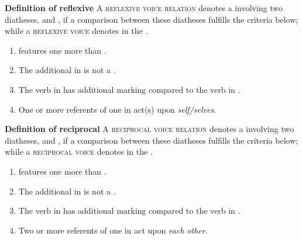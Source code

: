 \smallskip

\noindent
\begin{center}
	\begin{minipage}{0.80\textwidth}
		\textbf{Definition of reflexive} \newline
		A \textsc{reflexive voice relation} denotes a  involving two diatheses,  and , if a comparison between these diatheses fulfills the criteria below; while a \textsc{reflexive voice} denotes  in the .
		\begin{enumerate}[label=\roman*)]
			\item {} features one  more than .
			\item The additional  in  is not a .
			\item The verb in  has additional marking compared to the verb in .
			\item One or more referents of one  in  act(s) upon \textit{self/selves}.
		\end{enumerate}
	\end{minipage}
\end{center}

\noindent
\begin{center}
	\begin{minipage}{0.80\textwidth}
		\textbf{Definition of reciprocal} \newline
		A \textsc{reciprocal voice relation} denotes a  involving two diatheses,  and , if a comparison between these diatheses fulfills the criteria below; while a \textsc{reciprocal voice} denotes  in the .
		\begin{enumerate}[label=\roman*)]
			\item {} features one  more than .
			\item The additional  in  is not a .
			\item The verb in  has additional marking compared to the verb in .
			\item Two or more referents of one  in  act upon \textit{each other}.
		\end{enumerate}
	\end{minipage}
\end{center}

